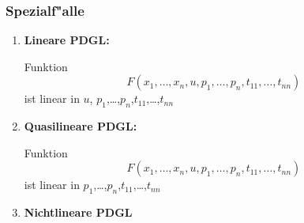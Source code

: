 \documentclass{beamer}
\begin{document}
\begin{frame}
\frametitle{Spezialf"alle}
\begin{enumerate}
\item {\bf Lineare PDGL:}

\pause
Funktion
\[
F(x_1,\dots,x_n,u,p_1,\dots,p_n,t_{11},\dots,t_{nn})
\]
ist linear in {\color{red}$u$}, $p_1$,\dots,$p_n$,$t_{11}$,\dots,$t_{nn}$
\pause
\item {\bf Quasilineare PDGL:}

\pause
Funktion
\[
F(x_1,\dots,x_n,u,p_1,\dots,p_n,t_{11},\dots,t_{nn})
\]
ist linear in $p_1$,\dots,$p_n$,$t_{11}$,\dots,$t_{nn}$
\pause
\item {\bf Nichtlineare PDGL}
\end{enumerate}
\end{frame}
\end{document}
